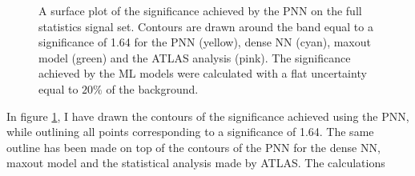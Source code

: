 \begin{figure}
    \caption[A surface plot of the significance comparing sensitivity limits set by \ac{PNN}, dense \ac{NN}, maxout model
    and the \ac{ATLAS} analysis, where the models have assumed a flat uncertainty of $20\%$.]{A surface plot of the significance achieved 
    by the \ac{PNN} on the full statistics signal set. Contours are drawn around the band equal to a significance of 1.64 for the \ac{PNN} 
    (yellow), dense \ac{NN} (cyan), maxout model (green) and the \ac{ATLAS} analysis \cite{atlas_search_2021} (pink). The significance achieved 
    by the \ac{ML} models were calculated with a flat uncertainty equal to $20\%$ of the background.}
    \label{fig:compLimit20}
\end{figure}
In figure \ref{fig:compLimit20}, I have drawn the contours of the significance achieved using the \ac{PNN},
while outlining all points corresponding to a significance of 1.64. The same outline has been made on top of the 
contours of the \ac{PNN} for the dense \ac{NN}, maxout model and the statistical analysis made by \ac{ATLAS}. The calculations
